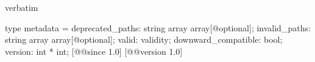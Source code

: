 \begin{camlexample}{verbatim}
\begin{caml}
\begin{camlinput}
type metadata = {
  deprecated_paths: string array array[@optional];
  invalid_paths: string array array[@optional];
  valid: validity;
  downward_compatible: bool;
  version: int * int;
} [@@since 1.0]
[@@version 1.0]
\end{camlinput}
\end{caml}
\end{camlexample}
